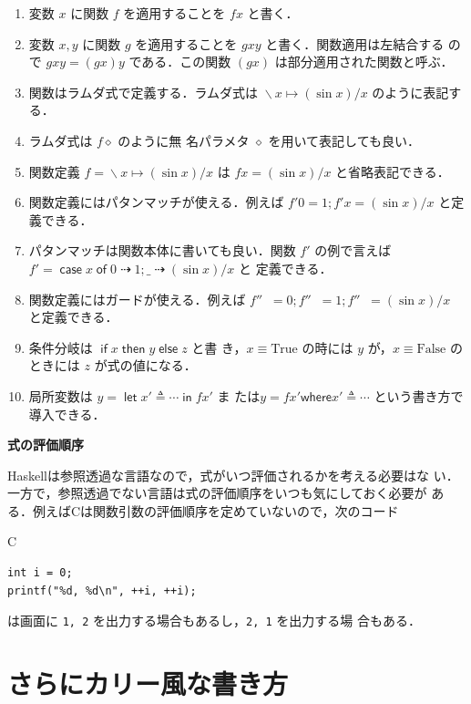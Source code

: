 \documentclass[a5paper,twoside,fleqn,draft]{jsbook}
\newcommand{\programminglanguage}[1]{\textsf{#1}}
\newcommand{\clang}{\programminglanguage{C}}
\newcommand{\haskell}{\programminglanguage{Haskell}}
\newenvironment{note}[1]{\begin{boxnote}\begin{center}\textbf{#1}\end{center}}{\end{boxnote}}
\newcommand{\code}[1]{\texttt{#1}}
\newenvironment{ccode}{\begin{itembox}[r]{\clang}}{\end{itembox}}
\newcommand{\mKeyword}[1]{\mathsf{#1}}
\newcommand{\mIfKeyword}{\mKeyword{if}}
\newcommand{\mCaseKeyword}{\mKeyword{case}}
\newcommand{\mElseKeyword}{\mKeyword{else}}
\newcommand{\mInKeyword}{\mKeyword{in}}
\newcommand{\mLetKeyword}{\mKeyword{let}}
\newcommand{\mOfKeyword}{\mKeyword{of}}
\newcommand{\mOtherwiseKeyword}{\mKeyword{otherwise}}
\newcommand{\mThenKeyword}{\mKeyword{then}}
\newcommand{\mWhereKeyword}{\mKeyword{where}}
\DeclareMathOperator{\mCaseKW}{\mCaseKeyword}
\DeclareMathOperator{\mElse}{\mElseKeyword}
\DeclareMathOperator{\mIf}{\mIfKeyword}
\DeclareMathOperator{\mLet}{\mLetKeyword}
\DeclareMathOperator{\mLetIn}{\mInKeyword}
\DeclareMathOperator{\mOfKW}{\mOfKeyword}
\DeclareMathOperator{\mOtherwise}{\mOtherwiseKeyword}
\DeclareMathOperator{\mThen}{\mThenKeyword}
\newcommand{\mSpecialConstant}[1]{\textrm{#1}}
\newcommand{\mFalse}{\mSpecialConstant{False}}
\newcommand{\mTrue}{\mSpecialConstant{True}}
\newcommand{\mAnonParam}{\diamond}
\DeclareMathOperator{\mIfSo}{\dashrightarrow}
\DeclareMathOperator{\mLambda}{\backslash}
\DeclareMathOperator{\mLambdaArrow}{\mapsto}
\DeclareMathOperator{\mLetEq}{\triangleq}
\newcommand{\mGuard}[1]{\mathop{\mid_{#1}}}
\newcommand{\mCaseOf}[1]{\mCaseKW#1\mOfKW}
\newcommand{\mIfThenElseEXP}[3]{\mIf{#1}\mThen{#2}\mElse{#3}} %
\newcommand{\mLambdaEXP}[2]{\mLambda{#1}\mLambdaArrow{#2}} %
\newcommand{\mLetInEXP}[3]{\mLet#1\mLetEq#2\mLetIn{#3}} %
\newcommand{\mWhereIsEXP}[2]{\mathbin{\mWhereKeyword}#1\mLetEq#2} %
\begin{document}
\begin{enumerate}
\item 変数 $x$ に関数 $f$ を適用することを $fx$ と書く．\item 変数
  $x,y$ に関数 $g$ を適用することを $gxy$ と書く．関数適用は左結合する
  ので $gxy=(gx)y$ である．この関数 $(gx)$ は部分適用された関数と呼ぶ．
\item 関数はラムダ式で定義する．ラムダ式は $\mLambdaEXP{x}{(\sin
  x)/x}$ のように表記する．\item ラムダ式は $f\mAnonParam$ のように無
  名パラメタ $\mAnonParam$ を用いて表記しても良い．\item 関数定義
  $f=\mLambdaEXP{x}{(\sin x)/x}$ は $fx=(\sin x)/x$ と省略表記できる．
\item 関数定義にはパタンマッチが使える．例えば $f'0=1;f'x=(\sin x)/x$
  と定義できる．\item パタンマッチは関数本体に書いても良い．関数 $f'$
  の例で言えば $f'=\mCaseOf{x}0\mIfSo1;\_\mIfSo(\sin x)/x$ と
  定義できる．\item 関数定義にはガードが使える．例えば
  $f''\mGuard{x<0}=0;f''\mGuard{x\equiv0}=1;f''\mGuard{\mOtherwise}=(\sin
  x)/x$ と定義できる．\item 条件分岐は $\mIfThenElseEXP{x}{y}{z}$ と書
  き，$x\equiv\mTrue$ の時には $y$ が，$x\equiv\mFalse$ のときには $z$
  が式の値になる．\item 局所変数は $y=\mLetInEXP{x'}{\dotsb}{fx'}$ ま
  たは$y=fx'\mWhereIsEXP{x'}{\dotsb}$ という書き方で導入できる．
\end{enumerate}


\begin{note}{式の評価順序}
\haskell は参照透過な言語なので，式がいつ評価されるかを考える必要はな
い．一方で，参照透過でない言語は式の評価順序をいつも気にしておく必要が
ある．例えば\clang は関数引数の評価順序を定めていないので，次のコード
\begin{ccode}
\begin{verbatim}
int i = 0;
printf("%d, %d\n", ++i, ++i);
\end{verbatim}
\end{ccode}
は画面に \code{1, 2} を出力する場合もあるし，\code{2, 1} を出力する場
合もある．
\end{note}

\chapter{さらにカリー風な書き方}
\label{ch:more-curry}
\end{document}
